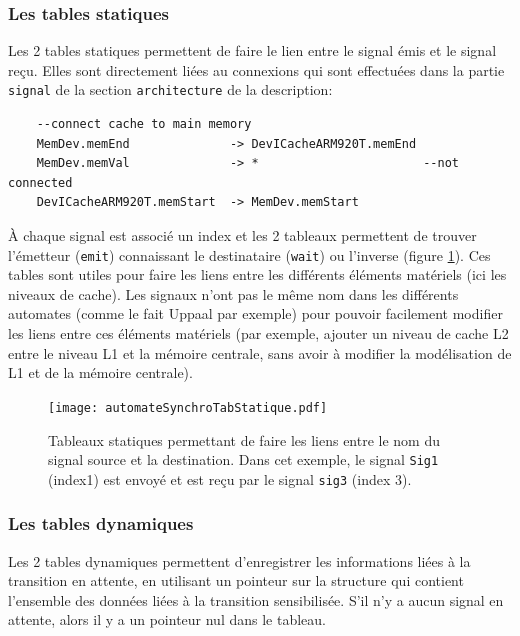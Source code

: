 \documentclass[11pt,a4paper]{article}
\begin{document}
\subsubsection{Les tables statiques}

Les 2 tables statiques permettent de faire le lien entre le signal émis et le signal reçu. Elles sont directement liées au connexions qui sont effectuées dans la partie \texttt{signal} de la section \texttt{architecture} de la description:
\begin{lstlisting}
    --connect cache to main memory
    MemDev.memEnd              -> DevICacheARM920T.memEnd
    MemDev.memVal              -> *                       --not connected
    DevICacheARM920T.memStart  -> MemDev.memStart
\end{lstlisting}
À chaque signal est associé un index et les 2 tableaux permettent de trouver l'émetteur (\texttt{emit}) connaissant le destinataire (\texttt{wait}) ou l'inverse (figure \ref{fig:automateSynchroTabStatique}). Ces tables sont utiles pour faire les liens entre les différents éléments matériels (ici les niveaux de cache). Les signaux n'ont pas le même nom dans les différents automates (comme le fait Uppaal par exemple) pour pouvoir facilement modifier les liens entre ces éléments matériels (par exemple, ajouter un niveau de cache L2 entre le niveau L1 et la mémoire centrale, sans avoir à modifier la modélisation de L1 et de la mémoire centrale).
\begin{figure}[htbp] %
   \centering
   \texttt{[image: automateSynchroTabStatique.pdf]} 
   \caption{Tableaux statiques permettant de faire les liens entre le nom du signal source et la destination. Dans cet exemple, le signal \texttt{Sig1} (index1) est envoyé et est reçu par le signal \texttt{sig3} (index 3).}
   \label{fig:automateSynchroTabStatique}
\end{figure}

\subsubsection{Les tables dynamiques}

Les 2 tables dynamiques permettent d'enregistrer les informations liées à la transition en attente, en utilisant un pointeur sur la structure qui contient l'ensemble des données liées à la transition sensibilisée. S'il n'y a aucun signal en attente, alors il y a un pointeur nul dans le tableau.
\end{document}
